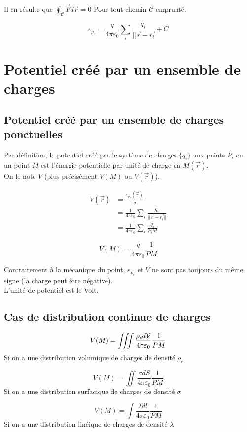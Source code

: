 \documentclass[../main.tex]{subfile}
\begin{document}
Il en résulte que $\oint_\mathcal{C} \vec{F} d\vec{r} = 0$
Pour tout chemin $\mathcal{C}$ emprunté.

$$\varepsilon_{p_e} = \frac{q}{4\pi\varepsilon_0} \sum\limits_i \frac{q_i}{||\vec{r} - \vec{r_i}} + C$$

\section{Potentiel créé par un ensemble de charges}
\subsection{Potentiel créé par un ensemble de charges ponctuelles}
Par définition, le potentiel créé par le système de charges $\{q_i\}$ aux points $P_i$ en un point $M$ est l'énergie potentielle par unité de charge en $M(\vec{r})$.\\
On le note $V$ (plus précisément $V(M)$ ou $V(\vec{r})$).

$$
\begin{aligned}
	V(\vec{r}) &= \frac{\varepsilon_{p_e}(\vec{r})}{q}\\
	&= \frac{1}{4\pi\varepsilon_0} \sum\limits_i \frac{q_i}{||\vec{r} - \vec{r_i}||}\\
	&= \frac{1}{4\pi\varepsilon_0} \sum\limits_i \frac{q_i}{P_iM}
\end{aligned}
$$

$$V(M) = \frac{q}{4\pi\varepsilon_0} \frac{1}{PM}$$

\begin{rema}
	Contrairement à la mécanique du point, $\varepsilon_{p_e}$ et $V$ ne sont pas toujours du même signe (la charge peut être négative).\\
	L'unité de potentiel est le Volt.
\end{rema}

\subsection{Cas de distribution continue de charges}
$$V(M) = \iiint \frac{\rho_c d \mathcal{V}}{4\pi\varepsilon_0} \frac{1}{PM}$$
Si on a une distribution volumique de charges de densité $\rho_c$

$$V(M) = \iint \frac{\sigma dS}{4\pi\varepsilon_0} \frac{1}{PM}$$
Si on a une distribution surfacique de charges de densité $\sigma$

$$V(M) = \int \frac{\lambda dl}{4\pi\varepsilon_0} \frac{1}{PM}$$
Si on a une distribution linéique de charges de densité $\lambda$
\end{document}
